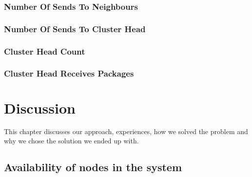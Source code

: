 \documentclass[USenglish]{uit-thesis}
\begin{document}
\subsection{Number Of Sends To Neighbours}



\subsection{Number Of Sends To Cluster Head}



\subsection{Cluster Head Count}


\subsection{Cluster Head Receives Packages}




\chapter{Discussion}

This chapter discusses our approach, experiences, how we solved the problem and why we chose the solution we ended up with.

\section{Availability of nodes in the system}
\end{document}
